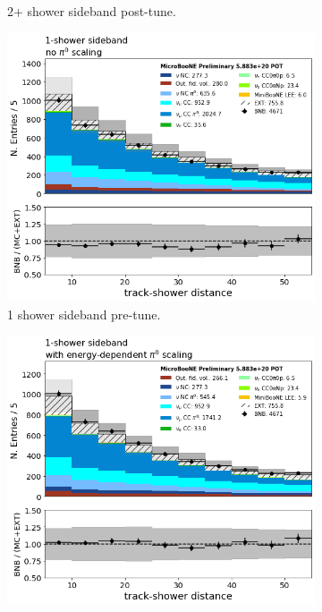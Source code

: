 \begin{figure}[H]
\begin{center}
\begin{subfigure}[b]{0.45\textwidth}
    \caption{\label{fig:pi0tune03} 2+ shower sideband post-tune.}
    \end{subfigure}
    \begin{subfigure}[b]{0.45\textwidth}
    \centering
    \includegraphics[width=1.00\textwidth]{pi0/pi0tune/tksh_distance_1shr_noscaling.png}
    \caption{\label{fig:pi0tune04} 1 shower sideband pre-tune.}
    \end{subfigure}
    \begin{subfigure}[b]{0.45\textwidth}
    \centering
    \includegraphics[width=1.00\textwidth]{pi0/pi0tune/tksh_distance_1shr.png}

\end{subfigure}
\end{center}
\end{figure}
